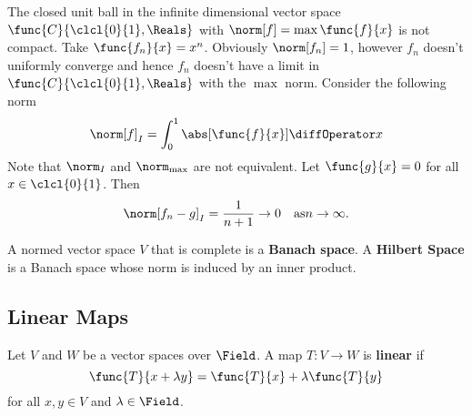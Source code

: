 %
%

\begin{example}
    The closed unit ball in the infinite dimensional vector space \(\func{C}{\clcl{0}{1},\Reals}\) with \(\norm[f] = \max \func{f}{x}\) is not compact.  Take \(\func{f_n}{x} = x^n\). Obviously \(\norm[f_n] = 1\), however \(f_n\) doesn't uniformly converge and hence \(f_n\) doesn't have a limit in \(\func{C}{\clcl{0}{1},\Reals}\) with the \(\max\) norm. Consider the following norm
    \begin{equation*}
        \norm[f]_I = \int_0^1 \abs[\func{f}{x}] \diffOperator x
    \end{equation*}
    Note that \(\norm_I\) and \(\norm_{\max} \) are not equivalent. Let \(\func{g}{x} = 0\) for all \(x \in \clcl{0}{1}\). Then
    \begin{equation*}
        \norm[f_n - g]_I = \dfrac{1}{n+1} \to 0 \quad \text{as} n \to \infty.
    \end{equation*}
\end{example}

\begin{definition}
    A normed vector space \(V\) that is complete is a \textbf{Banach space}. A \textbf{Hilbert Space} is a Banach space whose norm is induced by an inner product.
\end{definition}

\subsection{Linear Maps}
Let \(V\) and \(W\) be a vector spaces over \(\Field\). A map \(T: V \to W\) is \textbf{linear} if
\begin{equation*}
    \func{T}{x + \lambda y} = \func{T}{x} + \lambda \func{T}{y}
\end{equation*}
for all \(x,y \in V\) and \(\lambda \in \Field\).

